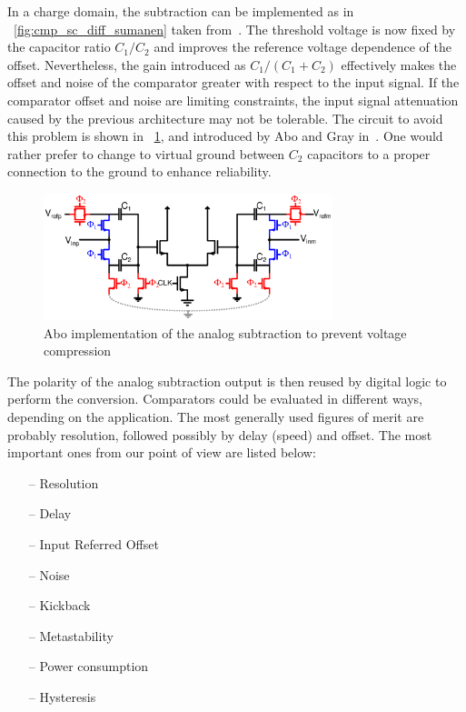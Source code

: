In a charge domain, the subtraction can be implemented as in \figurename~\ref{fig:cmp_sc_diff_sumanen} taken from~\cite{Sumanen2002}. The threshold voltage is now fixed by the capacitor ratio \(C_1/C_2 \) and improves the reference voltage dependence of the offset. Nevertheless, the gain introduced as \(C_1/(C_1+C_2) \) effectively makes the offset and noise of the comparator greater with respect to the input signal. If the comparator offset and noise are limiting constraints, the input signal attenuation caused by the previous architecture may not be tolerable. The circuit to avoid this problem is shown in \figurename~\ref{fig:abo_sc}, and introduced by Abo and Gray in~\cite{Abo1999}. One would rather prefer to change to virtual ground between \(C_2\) capacitors to a proper connection to the ground to enhance reliability.

\begin{figure}[htp]
	\centering
    \includegraphics[width=0.75\textwidth]{Chapter7/Figs/abo_sc.ps}
	\caption{Abo implementation of the analog subtraction to prevent voltage compression}
	\label{fig:abo_sc}
\end{figure}

The polarity of the analog subtraction output is then reused by digital logic to perform the conversion. Comparators could be evaluated in different ways, depending on the application. The most generally used figures of merit are probably resolution, followed possibly by delay (speed) and offset. The most important ones from our point of view are listed below:
\begin{multicols}{2}
    \begin{itemize}
        \itemsep-0.5em
        \item[--] Resolution
        \item[--] Delay
        \item[--] Input Referred Offset
        \item[--] Noise
        \item[--] Kickback
        \item[--] Metastability
        \item[--] Power consumption
        \item[--] Hysteresis
    \end{itemize}
\end{multicols}

